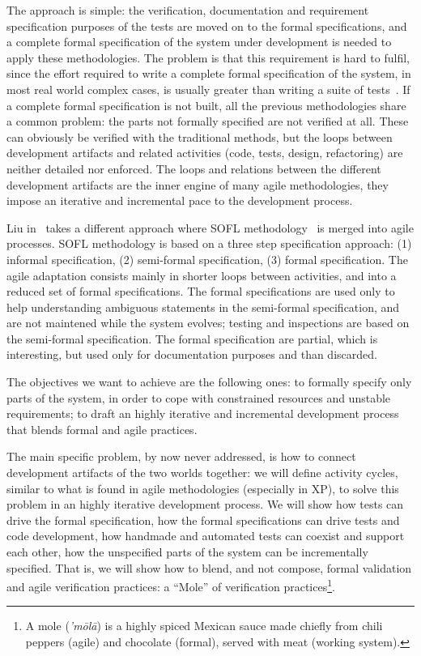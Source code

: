 \documentclass{article}
\begin{document}
The approach is simple: the verification, documentation and requirement specification purposes of the tests are moved on to the formal specifications, and a complete formal specification of the system under development is needed to apply these methodologies.
The problem is that this requirement is hard to fulfil, since the effort required to write a complete formal specification of the system, in most real world complex cases, is usually greater than writing a suite of tests~\cite{Glass2002}.
If a complete formal specification is not built, all the previous methodologies share a common problem: the parts not formally specified are not verified at all.
These can obviously be verified with the traditional methods, but the loops between development artifacts and related activities (code, tests, design, refactoring) are neither detailed nor enforced.
The loops and relations between the different development artifacts are the inner engine of many agile methodologies, they impose an iterative and incremental pace to the development process.

Liu in~\cite{Liu2010} takes a different approach where SOFL methodology~\cite{Liu2004} is merged into agile processes. 
SOFL methodology is based on a three step specification approach: (1) informal specification, (2) semi-formal specification, (3) formal specification. 
The agile adaptation consists mainly in shorter loops between activities, and into a reduced set of formal specifications.
The formal specifications are used only to help understanding ambiguous statements in the semi-formal specification, and are not maintened while the system evolves; testing and inspections are based on the semi-formal specification.
The formal specification are partial, which is interesting, but used only for documentation purposes and than discarded.

The objectives we want to achieve are the following ones: to formally specify only parts of the system, in order to cope with constrained resources and unstable requirements; to draft an highly iterative and incremental development process that blends formal and agile practices.

The main specific problem, by now never addressed, is how to connect development artifacts of the two worlds together: we will define activity cycles, similar to what is found in agile methodologies (especially in XP), to solve this problem in an highly iterative development process.
We will show how tests can drive the formal specification, how the formal specifications can drive tests and code development, how handmade and automated tests can coexist and support each other, how the unspecified parts of the system can be incrementally specified.
That is, we will show how to blend, and not compose, formal validation and agile verification practices: a ``Mole'' of verification practices\footnote{A mole (\emph{'m\=ol\=a}) is a highly spiced Mexican sauce made chiefly from chili peppers (agile) and chocolate (formal), served with meat (working system).}.
\end{document}
